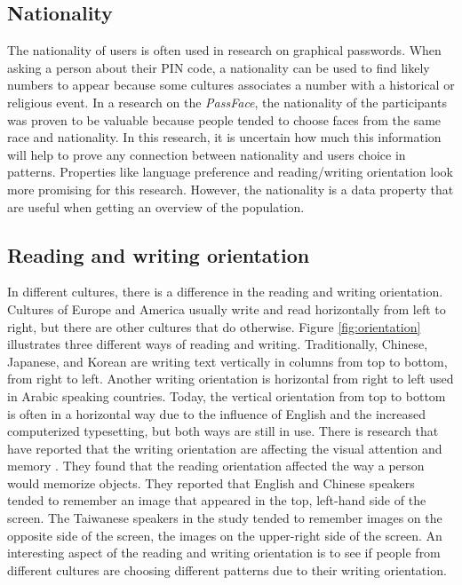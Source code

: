       \subsection*{Nationality} 
      The nationality of users is often used in research on graphical passwords. When asking a person about their PIN code, a nationality can be used to find likely numbers to appear because some cultures associates a number with a historical or religious event. In a research on the {\it PassFace}, the nationality of the participants was proven to be valuable because people tended to choose faces from the same race and nationality. In this research, it is uncertain how much this information will help to prove any connection between nationality and users choice in patterns. Properties like language preference and reading/writing orientation look more promising for this research. However, the nationality is a data property that are useful when getting an overview of the population.

      \subsection*{Reading and writing orientation}
      In different cultures, there is a difference in the reading and writing orientation. Cultures of Europe and America usually write and read horizontally from left to right, but there are other cultures that do otherwise. Figure \ref{fig:orientation} illustrates three different ways of reading and writing. Traditionally, Chinese, Japanese, and Korean are writing text vertically in columns from top to bottom, from right to left. Another writing orientation is horizontal from right to left used in Arabic speaking countries. Today, the vertical orientation from top to bottom is often in a horizontal way due to the influence of English and the increased computerized typesetting, but both ways are still in use. There is research that have reported that the writing orientation are affecting the visual attention and memory \cite{Chan}. They found that the reading orientation affected the way a person would memorize objects. They reported that English and Chinese speakers tended to remember an image that appeared in the top, left-hand side of the screen. The Taiwanese speakers in the study tended to remember images on the opposite side of the screen, the images on the upper-right side of the screen. An interesting aspect of the reading and writing orientation is to see if people from different cultures are choosing different patterns due to their writing orientation. 

